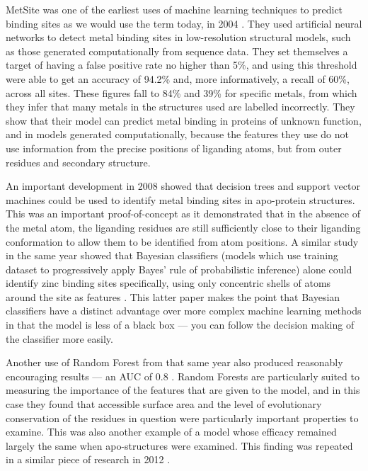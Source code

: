 MetSite was one of the earliest uses of machine learning techniques to predict binding sites as we would use the term today, in 2004 \cite{sodhi2004predicting}. They used artificial neural networks to detect metal binding sites in low-resolution structural models, such as those generated computationally from sequence data. They set themselves a target of having a false positive rate no higher than 5\%, and using this threshold were able to get an  accuracy of 94.2\% and, more informatively, a recall of 60\%, across all sites. These figures fall to 84\% and 39\% for specific metals, from which they infer that many metals in the structures used are labelled incorrectly. They show that their model can predict metal binding in proteins of unknown function, and in models generated computationally, because the features they use do not use information from the precise positions of liganding atoms, but from outer residues and secondary structure.

An important development in 2008 showed that decision trees and support vector machines could be used to identify metal binding sites in apo-protein structures. This was an important proof-of-concept as it demonstrated that in the absence of the metal atom, the liganding residues are still sufficiently close to their liganding conformation to allow them to be identified from atom positions. A similar study in the same year showed that Bayesian classifiers (models which use training dataset to progressively apply Bayes' rule of probabilistic inference) alone could identify zinc binding sites specifically, using only concentric shells of atoms around the site as features \cite{ebert2008}. This latter paper makes the point that Bayesian classifiers have a distinct advantage over more complex machine learning methods in that the model is less of a black box --- you can follow the decision making of the classifier more easily.

Another use of Random Forest from that same year also produced reasonably encouraging results --- an AUC of 0.8 \cite{bordner2008}. Random Forests are particularly suited to measuring the importance of the features that are given to the model, and in this case they found that accessible surface area and the level of evolutionary conservation of the residues in question were particularly important properties to examine. This was also another example of a model whose efficacy remained largely the same when apo-structures were examined. This finding was repeated in a similar piece of research in 2012 \cite{zheng2012}.

